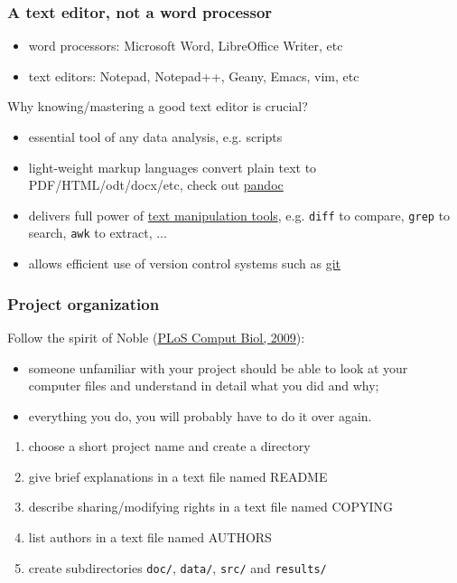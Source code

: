 \documentclass[c]{beamer} %
\begin{document}
\begin{frame}[fragile]
  \frametitle{A text editor, not a word processor}
  \begin{itemize}
  \item word processors: Microsoft Word, LibreOffice Writer, etc
  \item text editors: Notepad, Notepad++, Geany, Emacs, vim, etc
  \end{itemize}
  
  \bigskip
  \pause
  
  Why \alert{knowing/mastering a good text editor is crucial}?
  \begin{itemize}
  \item essential tool of any data analysis, e.g. scripts
  \item light-weight markup languages convert plain text to PDF/HTML/odt/docx/etc, check out \href{http://johnmacfarlane.net/pandoc/}{pandoc}
  \item delivers full power of \href{http://www.ibm.com/developerworks/aix/library/au-unixtext/index.html}{text manipulation tools}, e.g. \verb+diff+ to compare, \verb+grep+ to search, \verb+awk+ to extract, ...
  \item allows efficient use of version control systems such as \href{http://www.git-scm.com/}{git}
  \end{itemize}
\end{frame}

\begin{frame}[fragile]
  \frametitle{Project organization}
  Follow the spirit of Noble (\href{http://dx.doi.org/10.1371/journal.pcbi.1000424}{PLoS Comput Biol, 2009}):
  \begin{itemize}
  \item someone unfamiliar with your project should be able to look at your computer files and understand in detail what you did and why;
  \item everything you do, you will probably have to do it over again.
  \end{itemize}
  
  \bigskip
  \pause
  
  \begin{enumerate}
  \item choose a short project name and create a directory
  \item give brief explanations in a text file named README
  \item describe sharing/modifying rights in a text file named COPYING
  \item list authors in a text file named AUTHORS
  \item create subdirectories \verb+doc/+, \verb+data/+, \verb+src/+ and \verb+results/+
  \end{enumerate}
\end{frame}
\end{document}
